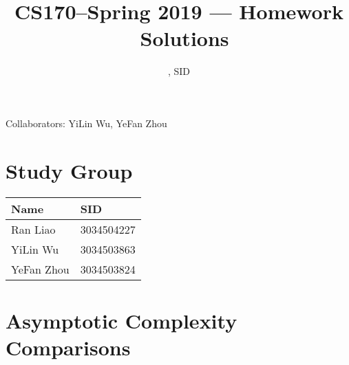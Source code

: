 \documentclass[11pt]{article}
\title{CS170--Spring 2019 --- Homework \Homework\ Solutions}
\author{\Name, SID \SID}
\date{}
\begin{document}
\maketitle
Collaborators: YiLin Wu, YeFan Zhou

\section{Study Group}
\begin{tabular}{ll}
    Name        &   SID         \\\hline
    Ran Liao    &   3034504227  \\  
    YiLin Wu    &   3034503863  \\
    YeFan Zhou  &   3034503824 
\end{tabular}

\newpage
\section{Asymptotic Complexity Comparisons}
\end{document}
